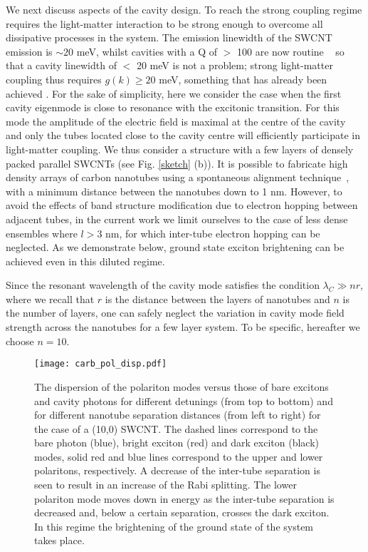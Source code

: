 \documentclass[journal=aamick,manuscript=article]{achemso}
\begin{document}
We next discuss aspects of the cavity design. To reach the strong coupling regime requires the light-matter interaction to be strong enough to overcome all dissipative processes in the system. The emission linewidth of the SWCNT emission is $\sim 20$ meV, whilst cavities with a Q of $>$ 100 are now routine ~\cite{Microcavities} so that a cavity linewidth of $<$ 20 meV is not a problem; strong light-matter coupling thus requires $g(k)\geq 20$ meV, something that has already been achieved \cite{Graf2016}. 
For the sake of simplicity, here we consider the case when the first cavity eigenmode is close to resonance with the excitonic transition.
For this mode the amplitude of the electric field is maximal at the centre of the cavity and only the tubes located close to the cavity centre will efficiently participate in light-matter coupling.
We thus consider a structure with a few layers of densely packed parallel SWCNTs (see Fig. \ref{sketch} (b)).
It is possible to fabricate high density arrays of carbon nanotubes using a spontaneous alignment technique~\cite{He2016}, with a minimum distance between the nanotubes down to 1 nm.
However, to avoid the effects of  band structure modification due to electron hopping between adjacent tubes, in the current work we limit ourselves to the case of less dense ensembles where $l>3$ nm, for which inter-tube electron hopping can be neglected.
As we demonstrate below, ground state exciton brightening can be achieved even in this diluted regime.

Since the resonant wavelength of the cavity mode satisfies the condition $\lambda_C \gg n r$, where we recall that $r$ is the distance between the layers of nanotubes and $n$  is the number of layers, one can safely neglect the variation in cavity mode field strength across the nanotubes for a few layer system. To be specific, hereafter we choose $n=10$.

%
\begin{figure*}
  \centering
  \texttt{[image: carb\_pol\_disp.pdf]}
  \caption{The dispersion of the polariton modes versus those of bare excitons and cavity photons for different detunings (from top to bottom) and for different nanotube separation distances (from left to right) for the case of a (10,0) SWCNT.
The dashed lines correspond to the bare photon (blue), bright exciton (red) and dark exciton (black) modes, solid red and blue lines correspond to the upper and lower polaritons, respectively. A decrease of the inter-tube separation is seen to result in an increase of the Rabi splitting. The lower polariton mode moves down in energy as the inter-tube separation is decreased and, below a certain separation, crosses the dark exciton. In this regime the brightening of the ground state of the system takes place.}
  \label{dispersion}
\end{figure*}
%
\end{document}
